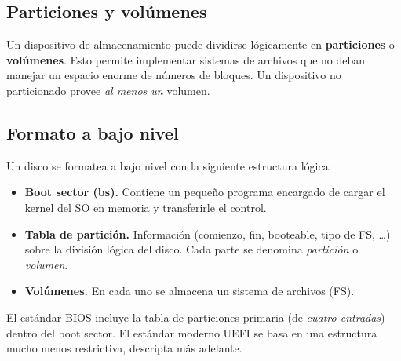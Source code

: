 \documentclass[11pt,a4paper]{article}
\begin{document}
\subsection{Particiones y volúmenes}

Un dispositivo de almacenamiento puede dividirse lógicamente en
\textbf{particiones} o \textbf{volúmenes}. Esto permite implementar
sistemas de archivos que no deban manejar un espacio enorme de números
de bloques. Un dispositivo no particionado provee \emph{al menos un}
volumen.

\subsection{Formato a bajo nivel}

Un disco se formatea a bajo nivel con la siguiente estructura lógica:

\begin{center}
\end{center}

\begin{itemize}[leftmargin=*]
    \item \textbf{Boot sector (bs).} Contiene un pequeño programa
        encargado de cargar el kernel del SO en memoria y transferirle
        el control.
    \item \textbf{Tabla de partición.} Información (comienzo, fin,
        booteable, tipo de FS, \ldots) sobre la división lógica del
        disco. Cada parte se denomina \emph{partición} o
        \emph{volumen}.
    \item \textbf{Volúmenes.} En cada uno se almacena un sistema de
        archivos (FS).
\end{itemize}

\begin{importante}
El estándar BIOS incluye la tabla de particiones primaria (de
\emph{cuatro entradas}) dentro del boot sector. El estándar moderno
UEFI se basa en una estructura mucho menos restrictiva, descripta más
adelante.
\end{importante}
\end{document}
